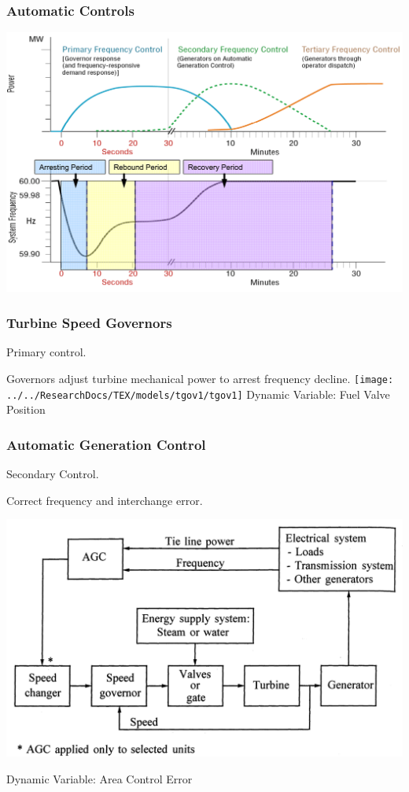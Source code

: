 \documentclass[14pt, unknownkeysallowed]{beamer}
\begin{document}
\begin{frame}
\frametitle{Automatic Controls}
\begin{center}
\includegraphics[height=.85\textheight]{ctrlReactionFlip} %
\end{center}
\end{frame}
\begin{frame}
\frametitle{Turbine Speed Governors}
Primary control.

Governors adjust turbine mechanical power to arrest frequency decline. 
{\centering\texttt{[image: ../../ResearchDocs/TEX/models/tgov1/tgov1]}}
Dynamic Variable: Fuel Valve Position
\end{frame}
\begin{frame}
\frametitle{Automatic Generation Control}
Secondary Control.

Correct frequency and interchange error.
\begin{center}
\includegraphics[height=.55\textheight]{AGCblockdiagram}
{\footnotesize\cite{Kundur}}
\end{center}
Dynamic Variable: Area Control Error
\end{frame}
\end{document}
